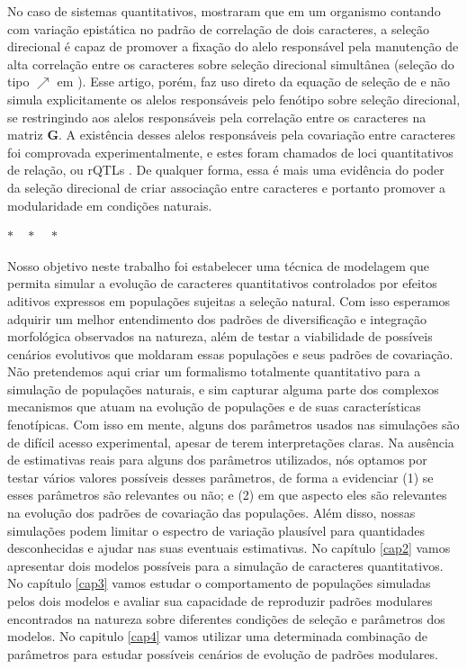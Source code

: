 No caso de sistemas quantitativos, \cite{Pavlicev2010} mostraram que em um
organismo contando com variação epistática no padrão de correlação de dois
caracteres, a seleção direcional é capaz de promover a fixação do alelo
responsável pela manutenção de alta correlação entre os caracteres sobre
seleção direcional simultânea  (seleção do tipo $\nearrow$ em
\cite{Jones2004}).
Esse artigo, porém, faz uso direto da equação de seleção de
\cite{Lande1979} e não simula explicitamente os alelos responsáveis pelo
fenótipo sobre seleção direcional, se restringindo aos alelos
responsáveis pela correlação entre os caracteres na matriz $\mathbf{G}$.
A existência desses alelos responsáveis pela covariação entre caracteres foi
comprovada experimentalmente, e estes foram chamados de loci
quantitativos de relação, ou rQTLs \citep{Pavlicev2008a}.
De qualquer forma, essa é mais uma evidência do poder da seleção
direcional de criar associação entre caracteres e portanto promover a
modularidade em condições naturais.

\centerline { $ * \quad * \quad * $ }

Nosso objetivo neste trabalho foi estabelecer uma técnica de modelagem
que permita simular a evolução de caracteres quantitativos controlados
por efeitos aditivos expressos em populações sujeitas a seleção natural.
Com isso esperamos adquirir um melhor entendimento dos padrões de
diversificação e integração morfológica observados na natureza, além de
testar a viabilidade de possíveis cenários evolutivos que moldaram essas
populações e seus padrões de covariação.
Não pretendemos aqui criar um formalismo totalmente quantitativo para a
simulação de populações naturais, e sim capturar alguma parte dos
complexos mecanismos que atuam na evolução de populações e de suas
características fenotípicas.
Com isso em mente, alguns dos parâmetros usados nas simulações são de
difícil acesso experimental, apesar de terem interpretações claras.
Na ausência de estimativas reais para alguns dos parâmetros utilizados,
nós optamos por testar vários valores possíveis desses parâmetros, de
forma a evidenciar (1) se esses parâmetros são relevantes ou não; e (2)
em que aspecto eles são relevantes na evolução dos padrões de covariação
das populações.
Além disso, nossas simulações podem limitar o espectro de variação
plausível para quantidades desconhecidas e ajudar nas suas eventuais
estimativas.
No capítulo \ref{cap2} vamos apresentar dois modelos possíveis para a
simulação de caracteres quantitativos.
No capítulo \ref{cap3} vamos estudar o comportamento de populações
simuladas pelos dois modelos e avaliar sua capacidade de reproduzir
padrões modulares encontrados na natureza sobre diferentes condições de
seleção e parâmetros dos modelos.
No capitulo \ref{cap4} vamos utilizar uma determinada combinação de
parâmetros para estudar possíveis cenários de evolução de padrões
modulares.

